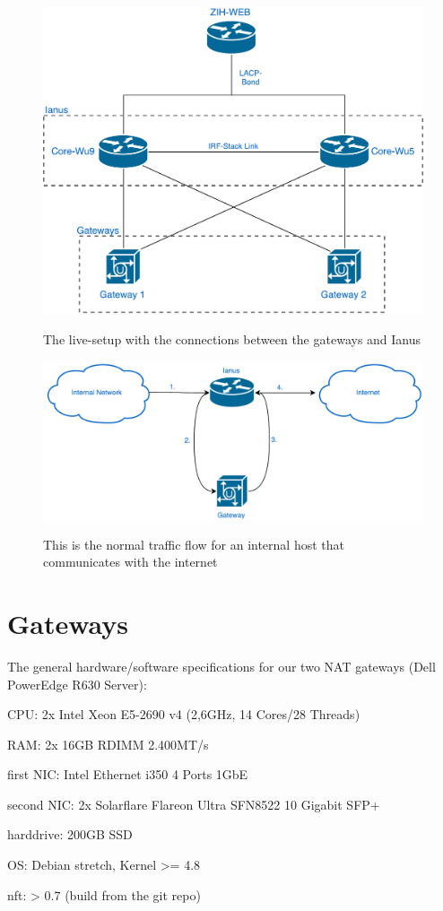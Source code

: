 \documentclass{report}
\begin{document}
\begin{figure}[ht]
	\centering
	\includegraphics[width=\textwidth]{../LiveSetup.pdf}
	\label{LiveSetup.pdf}
	\caption{The live-setup with the connections between the gateways and Ianus}  
\end{figure}

\begin{figure}[ht]
	\centering
	\includegraphics[width=\textwidth]{../NetworkFlow.pdf}
	\label{NetworkFlow.pdf}
	\caption{This is the normal traffic flow for an internal host that communicates with the internet}  
\end{figure}


\section{Gateways}\label{gateways}

The general hardware/software specifications for our two NAT gateways (Dell PowerEdge R630 Server): \\
\begin{description}
\item CPU: 2x Intel Xeon E5-2690 v4 (2,6GHz, 14 Cores/28 Threads)
\item RAM: 2x 16GB RDIMM 2.400MT/s
\item first NIC: Intel Ethernet i350 4 Ports 1GbE
\item second NIC: 2x Solarflare Flareon Ultra SFN8522 10 Gigabit SFP+
\item harddrive: 200GB SSD
\item OS: Debian stretch, Kernel \textgreater{}= 4.8
\item nft: \textgreater{} 0.7 (build from the git repo)
\end{description}
\end{document}
